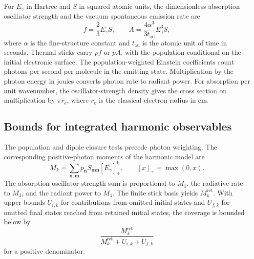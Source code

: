 For $E_\gamma$ in Hartree and $S$ in squared atomic units, the dimensionless
absorption oscillator strength and the vacuum spontaneous emission rate are
\begin{equation}
 f=\frac{2}{3}E_\gamma S,
 \qquad A=\frac{4\alpha^3}{3t_{\mathrm{au}}}E_\gamma^3 S ,
 \label{eq:optical-weight}
\end{equation}
where $\alpha$ is the fine-structure constant and $t_{\mathrm{au}}$ is the
atomic unit of time in seconds. Thermal sticks carry $pf$ or $pA$, with
the population conditional on the initial electronic surface. The
population-weighted Einstein coefficients count photons per second per
molecule in the emitting state. Multiplication by the photon energy in
joules converts photon rate to radiant power. For absorption per unit
wavenumber, the oscillator-strength density gives the cross section on
multiplication by $\pi r_e$, where $r_e$ is the classical electron radius
in cm.

\subsection{Bounds for integrated harmonic observables}

The population and dipole closure tests precede photon weighting.
The corresponding positive-photon moments of the harmonic model are
\begin{equation}
 M_k=\sum_{\mathbf n,\mathbf m}p_{\mathbf n}S_{\mathbf m\mathbf n}
       [E_\gamma]_+^k,\qquad [x]_+=\max(0,x).
 \label{eq:harmonic-photon-moments}
\end{equation}
The absorption oscillator-strength sum is proportional to $M_1$,
the radiative rate to $M_3$, and the radiant power to $M_4$.
The finite stick basis yields $M_k^{\mathrm{ret}}$. With upper bounds
$U_{i,k}$ for contributions from omitted initial states and $U_{f,k}$
for omitted final states reached from retained initial states, the
coverage is bounded below by
\begin{equation}
 \frac{M_k^{\mathrm{ret}}}{M_k^{\mathrm{ret}}+U_{i,k}+U_{f,k}}
 \label{eq:harmonic-moment-coverage}
\end{equation}
for a positive denominator.

